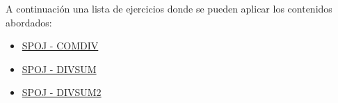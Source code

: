 A continuación una lista de ejercicios donde se pueden aplicar los contenidos abordados:

\begin{itemize}
	\item \href{https://www.spoj.com/problems/COMDIV/}{SPOJ - COMDIV}
	\item \href{https://www.spoj.com/problems/DIVSUM/}{SPOJ - DIVSUM}
	\item \href{https://www.spoj.com/problems/DIVSUM2/}{SPOJ - DIVSUM2}
\end{itemize}